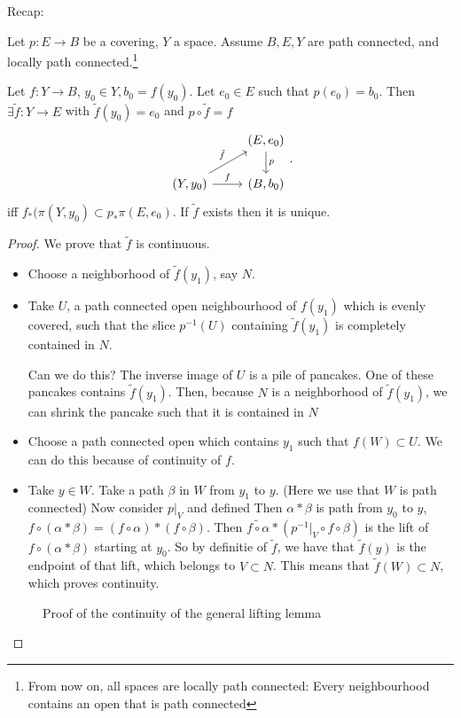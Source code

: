 

Recap:

\begin{lemma}
    Let $p: E \to B $ be a covering, $Y$ a space.
    Assume $B, E, Y$ are path connected, and locally path connected.\footnote{From now on, all spaces are locally path connected: Every neighbourhood contains an open that is path connected}

    Let $f: Y \to  B$, $y_0 \in Y, b_0  = f(y_0)$.
    Let $e_0 \in E$ such that $p(e_0) = b_0$.
    Then $\exists  \tilde{f}: Y \to  E$ with $\tilde{f}(y_0) = e_0$ and $p  \circ  \tilde{f} = f$
    \[
    \begin{tikzcd}
        & (E, e_0) \arrow[d, "p"]\\
        (Y, y_0) \arrow[r, "f"] \arrow[ur, "\tilde{f}"]&(B, b_0)
    \end{tikzcd}
    .\] 
    iff $f_*(\pi(Y, y_0) \subset p_* \pi(E, e_0)$.
    If $\tilde{f}$ exists then it is unique.
\end{lemma}
\begin{proof}
    We prove that $\tilde{f}$ is continuous.

    \begin{itemize}
        \item Choose a neighborhood of $\tilde{f}(y_1)$, say $N$.
        \item Take $U$, a path connected open neighbourhood of $f(y_1)$ which is evenly covered, such that the slice $p^{-1}(U)$ containing $\tilde{f}(y_1)$ is completely contained in $N$.


            Can we do this?
            The inverse image of $U$ is a pile of pancakes. One of these pancakes contains $\tilde{f}(y_1)$. Then, because $N$ is a neighborhood of $\tilde{f}(y_1)$, we can shrink the pancake such that it is contained in $N$
        \item Choose a path connected open which contains $y_1$ such that $f(W) \subset U$.
            We can do this because of continuity of $f$.
        \item Take $y \in W$. Take a path $\beta$ in $W$ from $y_1$ to $y$. (Here we use that $W$ is path connected)
            Now consider $p|_V$ and defined 
            Then $\alpha * \beta$ is path from  $y_0$ to $y$, $f  \circ (\alpha * \beta) = (f  \circ  \alpha) * (f  \circ \beta)$.
            Then $\widetilde{f  \circ \alpha} * (p^{-1}|_V  \circ  f  \circ  \beta)$ is the lift of $f  \circ  (\alpha * \beta)$ starting at $y_0$.
            So by definitie of $\tilde{f}$, we have that $\tilde{f}(y)$ is the endpoint of that lift, which belongs to $V \subset N$.
            This means that $\tilde{f}(W) \subset N$, which proves continuity.
    \end{itemize}
\begin{figure}[H]
    \centering
    \caption{Proof of the continuity of the general lifting lemma}
    \label{fig:general-lifting-lemma-continuous}
\end{figure}
\end{proof}

